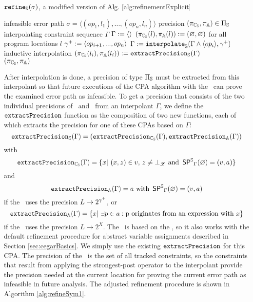 \begin{algorithm}[t]
\caption{$\texttt{refine}_{\mathbb{S}}(\sigma)$, a modified version of Alg. \ref{alg:refinementExplicit}}
\label{alg:refineSym1}
\begin{algorithmic}[1]
\Input infeasible error path $\sigma = \langle (op_1, l_1), ..., (op_n, l_n) \rangle$
\Output precision $(\pi_{\mathbb{C_{S}}}, \pi_{\mathbb{A}}) \in \Pi_{\mathbb{S}}$
\Variables interpolating constraint sequence $\Gamma$
\State $\Gamma := \langle \rangle$
\State $(\pi_{\mathbb{C_{S}}}(l), \pi_{\mathbb{A}}(l)) := (\varnothing, \varnothing)$ for all program locations $l$
	\State ${\gamma^{+}} := \langle op_{i+1}, ..., op_n \rangle$
	\State $\Gamma := \texttt{interpolate}_{\mathbb{S}}(\Gamma \wedge \langle op_i \rangle, {\gamma^{+}})$ \Comment inductive interpolation \label{alg:refinementExplicit:interpolation}
	\State $(\pi_{\mathbb{C_{S}}}(l_i), \pi_{\mathbb{A}}(l_i)) := \texttt{extractPrecision}_{\mathbb{S}}(\Gamma)$
\EndFor\\
\Return $(\pi_{\mathbb{C_{S}}}, \pi_{\mathbb{A}})$
\end{algorithmic}
\end{algorithm}

After interpolation is done, a precision of type $\Pi_{\mathbb{S}}$ must be extracted from this interpolant so that future executions of the CPA algorithm with the \symbolicExecutionCPA\ can prove the examined error path as infeasible.
To get a precision that consists of the two individual precisions of \symbolicValueAnalysisCPA\ and \constraintsCPA\ from an interpolant $\Gamma$, we define the $\texttt{extractPrecision}$ function as the composition of two new functions, each of which extracts the precision for one of these CPAs based on $\Gamma$:
\[\texttt{extractPrecision}_{\mathbb{S}}(\Gamma) = (\texttt{extractPrecision}_{\mathbb{C_{S}}}(\Gamma), \texttt{extractPrecision}_{\mathbb{A}}(\Gamma))\]
with
\[\texttt{extractPrecision}_{\mathbb{C_{S}}}(\Gamma) = \{ x |\ (x, z) \in v \text{, } z \neq \bot_{\mathscr{Z}} \text{ and } \operatorname{\operatorname{\operatorname{\mathsf{SP}}}^{\mathbb{S}}}_\Gamma (\varnothing) = (v, a) \}\]
and
\[\texttt{extractPrecision}_{\mathbb{A}}(\Gamma)  = a \text{ with } \operatorname{\operatorname{\operatorname{\mathsf{SP}}}^{\mathbb{S}}}_\Gamma (\varnothing) = (v, a)\]
if the \constraintsCPA\ uses the precision $L \rightarrow 2^{\gamma^+}$, or
\[\extractPrecisionConstrAlt{\Gamma} = \{ x |\ \exists p \in a : \text{p originates from an expression with $x$} \}\]
if the \constraintsCPA\ uses the precision $L \rightarrow 2^X$.
The \symbolicValueAnalysisCPA\ is based on the , so it also works with the default refinement procedure for abstract variable assignments described in Section \ref{sec:cegarBasics}.
We simply use the existing $\texttt{extractPrecision}$ for this CPA.
The precision of the \constraintsCPA\ is the set of all tracked constraints, so the constraints that result from applying the strongest-post operator to the interpolant provide the precision needed at the current location for proving the current error path as infeasible in future analysis.
The adjusted refinement procedure is shown in Algorithm \ref{alg:refineSym1}.

